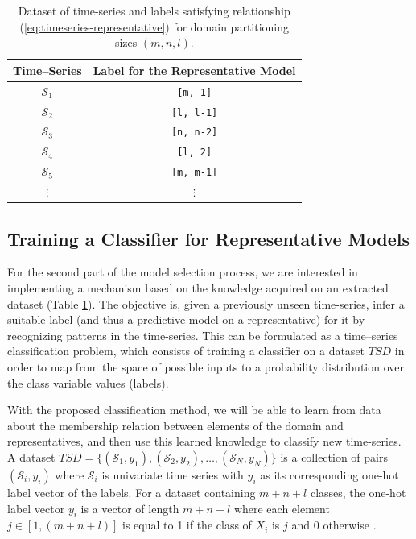 \begin{table}[h]
	\centering
	\begin{tabular}{|c|c|}
		\hline
		Time--Series   & Label for the Representative Model\\ \hline
		$\mathcal{S}_{1}$  & \texttt{[m, 1]} \\ \hline
		$\mathcal{S}_{2}$ & \texttt{[l, l-1]} \\ \hline
		$\mathcal{S}_{3}$ & \texttt{[n, n-2]} \\ \hline
		$\mathcal{S}_{4}$ & \texttt{[l, 2]} \\ \hline
		$\mathcal{S}_{5}$ & \texttt{[m, m-1]} \\ \hline
		$\vdots$       & $\vdots$ \\ \hline
	\end{tabular}
	\caption{Dataset of time-series and labels satisfying relationship (\ref{eq:timeseries-representative}) for domain partitioning sizes $(m,n,l)$.}
	\label{Tab:TSClassificationDataset}
\end{table}

\subsection{Training a Classifier for Representative Models}
\label{Sec:TrainingClassifier}
For the second part of the model selection process, we are interested in implementing a mechanism based on the knowledge acquired on an extracted dataset (Table \ref{Tab:TSClassificationDataset}). The objective is, given a previously unseen time-series, infer a suitable label (and thus a predictive model on a representative) for it by recognizing patterns in the time-series. This can be formulated as a time--series classification problem, which consists of training a classifier on a dataset $TSD$ in order to map from the space of possible inputs to a probability distribution over the class variable values (labels). 

With the proposed classification method, we will be able to learn from data about the membership relation between elements of the domain and representatives, and then use this learned knowledge to classify new time-series. A dataset $TSD=\{(\mathcal{S}_1,y_1),(\mathcal{S}_2,y_2), \ldots ,(\mathcal{S}_N,y_N)\}$ is a collection of pairs $(\mathcal{S}_i,y_i)$ where $\mathcal{S}_i$ is univariate time series with $y_i$ as its corresponding one-hot label vector of the labels. For a dataset containing $m+n+l$ classes, the one-hot label vector $y_i$ is a vector of length $m+n+l$ where each element $j \in [1,(m+n+l)]$ is equal to 1 if the class of $X_i$ is $j$ and $0$ otherwise \cite{Mitsa2010}.

